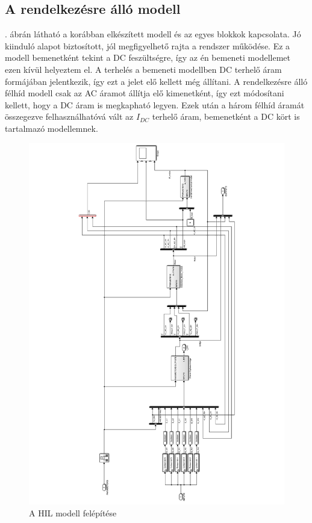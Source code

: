 \subsection{A rendelkezésre álló modell}

. ábrán látható a korábban elkészített modell és az egyes blokkok kapcsolata. Jó kiinduló alapot biztosított, jól megfigyelhető rajta a rendszer működése. Ez a modell bemenetként tekint a DC feszültségre, így az én bemeneti modellemet ezen kívül helyeztem el. A terhelés a bemeneti modellben DC terhelő áram formájában jelentkezik, így ezt a jelet elő kellett még állítani. A rendelkezésre álló félhíd modell csak az AC áramot állítja elő kimenetként, így ezt módosítani kellett, hogy a DC áram is megkapható legyen. Ezek után a három félhíd áramát összegezve felhasználhatóvá vált az $I_{DC}$ terhelő áram, bemenetként a DC kört is tartalmazó modellemnek.


\begin{figure}[]
	\centering
	\includegraphics[width = 1.1\textwidth]{figures/hil_model.pdf}
	\caption{A HIL modell felépítése} 
	\label{fig:original_model}
\end{figure}

